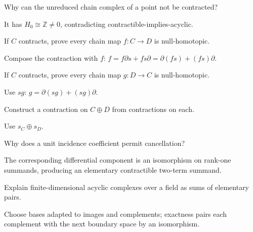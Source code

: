 \begin{problem}\label{prob:viii23-07}
Why can the unreduced chain complex of a point not be contracted?
\end{problem}
\begin{solution}
It has \(H_0\cong\mathbb Z\ne0\), contradicting contractible-implies-acyclic.
\end{solution}

\begin{problem}\label{prob:viii23-08}
If \(C\) contracts, prove every chain map \(f:C\to D\) is null-homotopic.
\end{problem}
\begin{solution}
Compose the contraction with \(f\): \(f=f\partial s+fs\partial=\partial(fs)+(fs)\partial\).
\end{solution}

\begin{problem}[Map in]\label{prob:viii23-09}
If \(C\) contracts, prove every chain map \(g:D\to C\) is null-homotopic.
\end{problem}
\begin{solution}
Use \(sg\): \(g=\partial(sg)+(sg)\partial\).
\end{solution}

\begin{problem}\label{prob:viii23-10}
Construct a contraction on \(C\oplus D\) from contractions on each.
\end{problem}
\begin{solution}
Use \(s_C\oplus s_D\).
\end{solution}

\begin{problem}\label{prob:viii23-11}
Why does a unit incidence coefficient permit cancellation?
\end{problem}
\begin{solution}
The corresponding differential component is an isomorphism on rank-one summands, producing an elementary contractible two-term summand.
\end{solution}

\begin{problem}\label{prob:viii23-12}
Explain finite-dimensional acyclic complexes over a field as sums of elementary pairs.
\end{problem}
\begin{solution}
Choose bases adapted to images and complements; exactness pairs each complement with the next boundary space by an isomorphism.
\end{solution}

